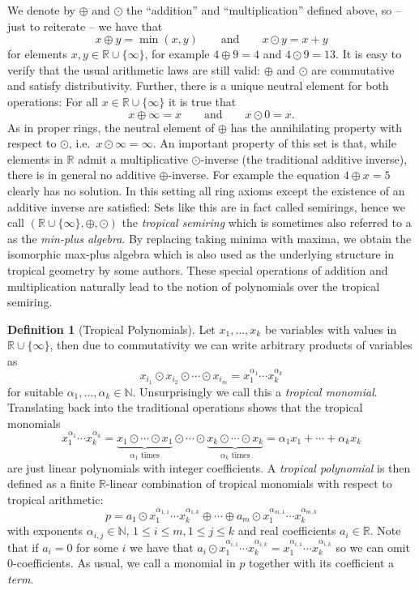 \documentclass[
  paper=a4,
  titlepage,
  bibliography=totoc,
  listof=totoc,
  pagesize=pdftex
]{scrartcl}
\numberwithin{figure}{section}
\numberwithin{equation}{section}
\numberwithin{table}{section}
\newcommand*\setR{\mathds{R}}
\newcommand*\setN{\mathds{N}}
\theoremstyle{definition}
\newtheorem{definition}{Definition}
\numberwithin{definition}{section}
\begin{document}
We denote by $\oplus$ and $\odot$ the \enquote{addition} and \enquote{multiplication}
defined above, so -- just to reiterate -- we have that
\[
  x \oplus y = \min(x,y)
  \qquad \text{and} \qquad
  x \odot y = x+y
\]
for elements $x,y\in \setR\cup\{\infty\}$, for example $4\oplus9 = 4$ and $4\odot9 = 13$.
It is easy to verify that the usual arithmetic laws are still valid: $\oplus$ and $\odot$
are commutative and satisfy distributivity. Further, there is a unique neutral  element
for both operations: For all $x\in \setR\cup \{\infty\}$ it is true that
\[
  x \oplus \infty = x
  \qquad \text{and} \qquad
  x \odot 0 = x.
\]
As in proper rings, the neutral element of $\oplus$ has the annihilating property with
respect to $\odot$, i.e.\ $x\odot \infty = \infty$. An important property of this set is
that, while elements in $\setR$ admit a multiplicative $\odot$-inverse (the traditional
additive inverse), there is in general no additive $\oplus$-inverse. For example the
equation $4\oplus x = 5$ clearly has no solution. In this setting all ring axioms except
the existence of an additive inverse are satisfied: Sets like this are in fact called
semirings, hence we call $(\setR\cup \{\infty\}, \oplus, \odot)$ the \emph{tropical
semiring} which is sometimes also referred to a as the \emph{min-plus algebra}. By
replacing taking minima with maxima, we obtain the isomorphic max-plus algebra which is
also used as the underlying structure in tropical geometry by some authors. These special
operations of addition and multiplication naturally lead to the notion of polynomials over
the tropical semiring.

\begin{definition}[Tropical Polynomials]
  \label{def:tropPoly}
  Let $x_1, \dots, x_k$ be variables with values in $\setR\cup\{\infty\}$, then due to
  commutativity we can write arbitrary products of variables as
  \[
    x_{i_1} \odot x_{i_2} \odot \cdots \odot x_{i_m}
    = x_1^{\alpha_1} \cdots x_k^{\alpha_k}
  \]
  for suitable $\alpha_1, \dots, \alpha_k \in \setN$. Unsurprisingly we call this a
  \emph{tropical monomial}. Translating back into the traditional operations shows that
  the tropical monomials
  \[
    x_1^{\alpha_1} \cdots x_k^{\alpha_k} =
    \underbrace{x_1\odot\cdots\odot x_1}_{\alpha_1 \text{ times}}
    \odot\cdots\odot
    \underbrace{x_k\odot\cdots\odot x_k}_{\alpha_k \text{ times}}
    = \alpha_1x_1 + \cdots + \alpha_kx_k
  \]
  are just linear polynomials with integer coefficients. A \emph{tropical polynomial} is
  then defined as a finite $\setR$-linear combination of tropical monomials with respect
  to tropical arithmetic:
  \[
    p = a_1 \odot x_1^{\alpha_{1,1}}\cdots x_k^{\alpha_{1,k}} \oplus \cdots \oplus
    a_m \odot x_1^{\alpha_{m,1}}\cdots x_k^{\alpha_{m,k}}
  \]
  with exponents $\alpha_{i,j} \in \setN$, $1\leq i \leq m, 1\leq j \leq k$ and real
  coefficients $a_i \in \setR$. Note that if $a_i = 0$ for some $i$ we have that $a_i\odot
  x_1^{\alpha_{i,1}}\cdots x_k^{\alpha_{i,k}} = x_1^{\alpha_{i,1}}\cdots
  x_k^{\alpha_{i,k}}$ so we can omit $0$-coefficients. As usual, we call a monomial in $p$
  together with its coefficient a \emph{term}.
\end{definition}
\end{document}
